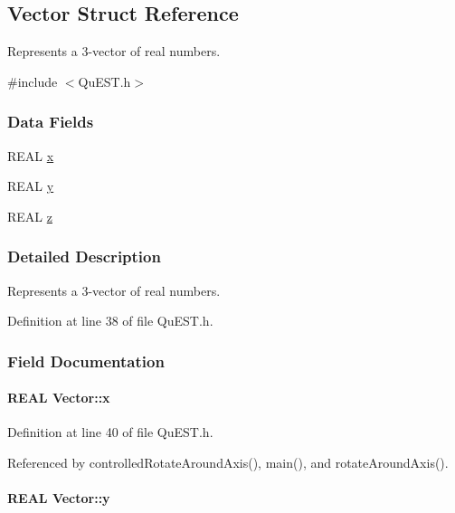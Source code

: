 \hypertarget{structVector}{
\subsection{Vector Struct Reference}
\label{structVector}
}


Represents a 3-\/vector of real numbers.  


{\ttfamily \#include $<$QuEST.h$>$}\subsubsection*{Data Fields}
\begin{DoxyCompactItemize}
\item 
REAL \hyperlink{structVector_aac7abe171ba4bada50ed72acba6259fc}{x}
\item 
REAL \hyperlink{structVector_a375ca805d4c808a53d7c4e0c737ae3de}{y}
\item 
REAL \hyperlink{structVector_ad4e863651be7d6b7e2b28cd7445a0ccf}{z}
\end{DoxyCompactItemize}


\subsubsection{Detailed Description}
Represents a 3-\/vector of real numbers. 

Definition at line 38 of file QuEST.h.

\subsubsection{Field Documentation}
\hypertarget{structVector_aac7abe171ba4bada50ed72acba6259fc}{
\paragraph[{x}]{\setlength{\rightskip}{0pt plus 5cm}REAL {\bf Vector::x}}\hfill}
\label{structVector_aac7abe171ba4bada50ed72acba6259fc}


Definition at line 40 of file QuEST.h.

Referenced by controlledRotateAroundAxis(), main(), and rotateAroundAxis().\hypertarget{structVector_a375ca805d4c808a53d7c4e0c737ae3de}{
\paragraph[{y}]{\setlength{\rightskip}{0pt plus 5cm}REAL {\bf Vector::y}}\hfill}
\label{structVector_a375ca805d4c808a53d7c4e0c737ae3de}


